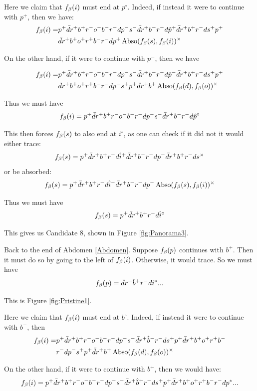Here we claim that $f_\beta(i)$ must end at $p^\circ$. Indeed, if instead it were to continue with $p^+$, then we have:
\begin{align*}
    f_\beta(i) =& p^+ \bar{d} r^+ b^+ r^- o^- b^- r^- d p^- s^- \bar{d} r^+ b^- r^- d \hat{p}^+ \bar{d} r^+ b^+ r^- d s^+ p^+\\
    &\bar{d} r^+ b^+ o^+ r^+ b^- r^- d p^+ \operatorname{Abso}(f_\beta(s), f_\beta(i))^\times
\end{align*}

On the other hand, if it were to continue with $p^-$, then we have

\begin{align*}
    f_\beta(i) =& p^+ \bar{d} r^+ b^+ r^- o^- b^- r^- d p^- s^- \bar{d} r^+ b^- r^- d \hat{p}^- \bar{d} r^+ b^+ r^- d s^+ p^+\\
    &\bar{d} r^+ b^+ o^+ r^+b^- r^- d p^- s^+ p^+\bar{d} r^+b^+ \operatorname{Abso}(f_\beta(d), f_\beta(o))^\times
\end{align*}

Thus we must have
\[
f_\beta(i) =p^+ \bar{d} r^+ b^+ r^- o^- b^- r^- d p^- s^- \bar{d} r^+ b^- r^- d \hat{p}^\circ
\]

This then forces $f_\beta(s)$ to also end at $i^\circ$, as one can check if it did not it would either trace:
\[
f_\beta(s) = p^+ \bar{d} r^+ b^+ r^- d \hat{i}^+ \bar{d} r^+ b^- r^- d p^- \bar{d} r^+ b^+ r^- d s^\times
\]
or be absorbed:
\[
f_\beta(s) = p^+ \bar{d} r^+ b^+ r^- d \hat{i}^- \bar{d} r^+ b^- r^- d p^- \operatorname{Abso}(f_\beta(s), f_\beta(i))^\times
\]

Thus we must have
\[
f_\beta(s) = p^+ \bar{d} r^+ b^+ r^- d \hat{i}^\circ
\]

This gives us Candidate 8, shown in Figure \ref{fig:Panorama3}.

\label{Pristine}
Back to the end of Abdomen \ref{Abdomen}. Suppose $f_\beta(p)$ continues with $b^+$. Then it must do so by going to the left of $f_\beta(i)$. Otherwise, it would trace. So we must have
\[
f_\beta(p) = \bar{d} r^+ \hat{b}^+ r^- d i^*...
\]

This is Figure \ref{fig:Pristine1}.

Here we claim that $f_\beta(i)$ must end at $b^\circ$. Indeed, if instead it were to continue with $b^-$, then
\begin{align*}
    f_\beta(i) =& p^+ \bar{d} r^+ b^+ r^- o^- b^- r^- d p^- s^- \bar{d} r^+ \hat{b}^- r^- d s^+ p^+ \bar{d} r^+ b^+ o^+ r^+ b^-\\
     &r^- d p^- s^+ p^+ \bar{d} r^+ b^+ \operatorname{Abso}(f_\beta(d), f_\beta(o))^\times
\end{align*}

On the other hand, if it were to continue with $b^+$, then we would have:
\[
f_\beta(i) = p^+ \bar{d} r^+ b^+ r^- o^- b^- r^- d p^- s^- \bar{d} r^+ \hat{b}^+ r^- d s^+ p^+ \bar{d} r^+ b^+ o^+ r^+ b^- r^- d p^*... 
\]

